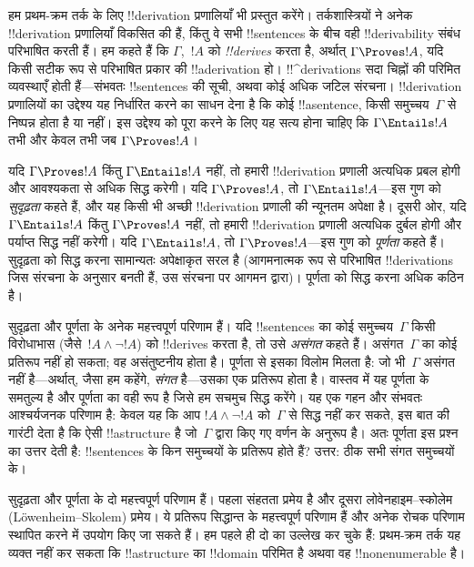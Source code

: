 \documentclass[../../../include/open-logic-section]{subfiles}
\begin{document}


हम प्रथम-क्रम तर्क के लिए !!{derivation} प्रणालियाँ भी प्रस्तुत करेंगे।
तर्कशास्त्रियों ने अनेक !!{derivation} प्रणालियाँ विकसित की हैं, किंतु वे
सभी !!{sentence}s के बीच वही !!{derivability} संबंध परिभाषित करती हैं। हम
कहते हैं कि $\Gamma$,~$!A$ को \emph{!!{derive}s} करता है, अर्थात्
$\Gamma \Proves !A$, यदि किसी सटीक रूप से परिभाषित प्रकार की
!!a{derivation} हो। !!^{derivation}s सदा चिह्नों की परिमित व्यवस्थाएँ होती
हैं---संभवतः !!{sentence}s की सूची, अथवा कोई अधिक जटिल संरचना।
!!{derivation} प्रणालियों का उद्देश्य यह निर्धारित करने का साधन देना है कि
कोई !!a{sentence}, किसी समुच्चय~$\Gamma$ से निष्पन्न होता है या नहीं। इस
उद्देश्य को पूरा करने के लिए यह सत्य होना चाहिए कि $\Gamma \Entails !A$
तभी और केवल तभी जब $\Gamma
\Proves !A$।

यदि $\Gamma \Proves !A$ किंतु $\Gamma \Entails !A$ नहीं, तो हमारी
!!{derivation} प्रणाली अत्यधिक प्रबल होगी और आवश्यकता से अधिक सिद्ध करेगी।
यदि $\Gamma
\Proves !A$, तो $\Gamma \Entails !A$---इस गुण को
\emph{सुदृढ़ता} कहते हैं, और यह किसी भी अच्छी !!{derivation} प्रणाली की
न्यूनतम अपेक्षा है। दूसरी ओर, यदि $\Gamma \Entails !A$ किंतु
$\Gamma \Proves !A$ नहीं, तो हमारी !!{derivation} प्रणाली अत्यधिक दुर्बल
होगी और पर्याप्त सिद्ध नहीं करेगी। यदि $\Gamma \Entails !A$, तो
$\Gamma \Proves !A$---इस गुण को \emph{पूर्णता} कहते हैं। सुदृढ़ता को सिद्ध
करना सामान्यतः अपेक्षाकृत सरल है (आगमनात्मक रूप से परिभाषित
!!{derivation}s जिस संरचना के अनुसार बनती हैं, उस संरचना पर आगमन द्वारा)।
पूर्णता को सिद्ध करना अधिक कठिन है।

सुदृढ़ता और पूर्णता के अनेक महत्त्वपूर्ण परिणाम हैं। यदि !!{sentence}s का
कोई समुच्चय~$\Gamma$ किसी विरोधाभास (जैसे~$!A \land \lnot !A$) को
!!{derive}s करता है, तो उसे \emph{असंगत} कहते हैं। असंगत~$\Gamma$ का कोई
प्रतिरूप नहीं हो सकता; वह असंतुष्टनीय होता है। पूर्णता से इसका विलोम मिलता है:
जो भी~$\Gamma$ असंगत नहीं है---अर्थात्, जैसा हम कहेंगे, \emph{संगत} है---उसका
एक प्रतिरूप होता है। वास्तव में यह पूर्णता के समतुल्य है और पूर्णता का वही
रूप है जिसे हम सचमुच सिद्ध करेंगे। यह एक गहन और संभवतः आश्चर्यजनक परिणाम है:
केवल यह कि आप $!A \land \lnot !A$ को~$\Gamma$ से सिद्ध नहीं कर सकते, इस बात
की गारंटी देता है कि ऐसी !!a{structure} है जो~$\Gamma$ द्वारा किए गए वर्णन
के अनुरूप है। अतः पूर्णता इस प्रश्न का उत्तर देती है: !!{sentence}s के किन
समुच्चयों के प्रतिरूप होते हैं? उत्तर: ठीक सभी संगत समुच्चयों के।

सुदृढ़ता और पूर्णता के दो महत्त्वपूर्ण परिणाम हैं। पहला संहतता प्रमेय है और
दूसरा लोवेनहाइम--स्कोलेम (L\"owenheim--Skolem) प्रमेय। ये प्रतिरूप सिद्धान्त के
महत्त्वपूर्ण परिणाम हैं और अनेक रोचक परिणाम स्थापित करने में उपयोग किए जा
सकते हैं। हम पहले ही दो का उल्लेख कर चुके हैं: प्रथम-क्रम तर्क यह व्यक्त
नहीं कर सकता कि !!a{structure} का !!{domain} परिमित है अथवा वह
!!{nonenumerable} है।
\end{document}
